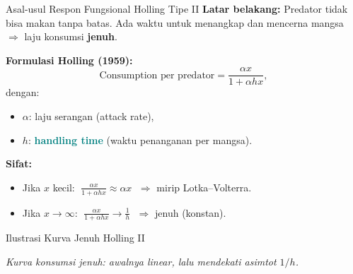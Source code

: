 \documentclass[aspectratio=32]{beamer}
\newcommand{\jsg}[1]{\textcolor{teal}{\textbf{#1}}}
\begin{document}
\begin{frame}{Asal-usul Respon Fungsional Holling Tipe II}
  \small
  \textbf{Latar belakang:} Predator tidak bisa makan tanpa batas.
  Ada waktu untuk menangkap dan mencerna mangsa 
  $\Rightarrow$ laju konsumsi \textbf{jenuh}.

  \vspace{0.5em}
  \textbf{Formulasi Holling (1959):}
  \[
    \text{Consumption per predator} 
    = \frac{\alpha x}{1+\alpha h x},
  \]
  dengan:
  \begin{itemize}
    \item $\alpha$: laju serangan (attack rate),
    \item $h$: \jsg{handling time} (waktu penanganan per mangsa).
  \end{itemize}

  \vspace{0.5em}
  \textbf{Sifat:}
  \begin{itemize}
    \item Jika $x$ kecil: $\;\frac{\alpha x}{1+\alpha h x} \approx \alpha x$
      $\;\Rightarrow$ mirip Lotka–Volterra.
    \item Jika $x \to \infty$: $\;\frac{\alpha x}{1+\alpha h x} \to \tfrac{1}{h}$
      $\;\Rightarrow$ jenuh (konstan).
  \end{itemize}
\end{frame}

\begin{frame}{Ilustrasi Kurva Jenuh Holling II}
  \centering

  \vspace{0.5em}
  \textit{Kurva konsumsi jenuh: awalnya linear, lalu mendekati asimtot $1/h$.}
\end{frame}
\end{document}

